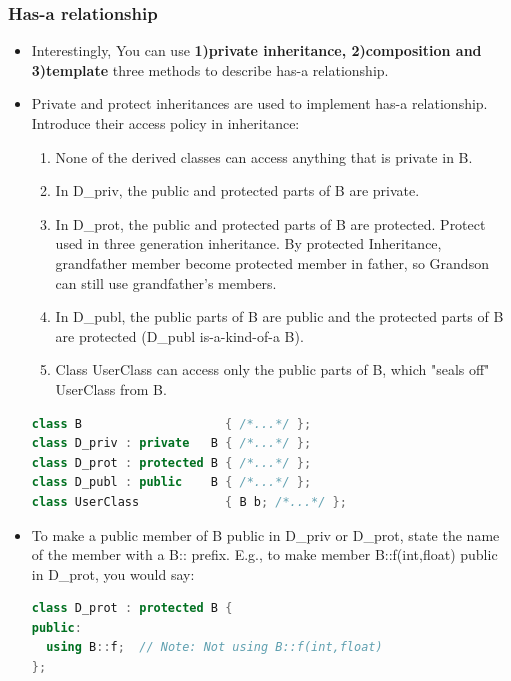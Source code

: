 \documentclass[a4paper,12pt,twoside]{book}
\begin{document}
\subsubsection{Has-a relationship}

\begin{itemize}
\item Interestingly, You can use \textbf{1)private inheritance, 2)composition and 3)template} three methods to describe has-a relationship.

\item Private and protect inheritances are used to implement has-a relationship. Introduce their access policy in inheritance:
\begin{enumerate}
\item None of the derived classes can access anything that is private in B.

\item In D\_priv, the public and protected parts of B are private.

\item In D\_prot, the public and protected parts of B are protected. Protect used in three generation inheritance. By protected Inheritance, grandfather member become protected member in father, so Grandson can still use grandfather's members.

\item In D\_publ, the public parts of  B are public and the protected parts of B are protected (D\_publ is-a-kind-of-a B).

\item Class UserClass can access only the public parts of B, which "seals off" UserClass from B.
\end{enumerate}


\begin{lstlisting}[frame=single, language=c++]
class B                    { /*...*/ };
class D_priv : private   B { /*...*/ };
class D_prot : protected B { /*...*/ };
class D_publ : public    B { /*...*/ };
class UserClass            { B b; /*...*/ };
\end{lstlisting}

\item To make a public member of B public in D\_priv or D\_prot, state the name of the member with a B:: prefix. E.g., to make member B::f(int,float) public in D\_prot, you would say:
\begin{lstlisting}[frame=single, language=c++]
class D_prot : protected B {
public:
  using B::f;  // Note: Not using B::f(int,float)
};
\end{lstlisting}


\end{itemize}
\end{document}
